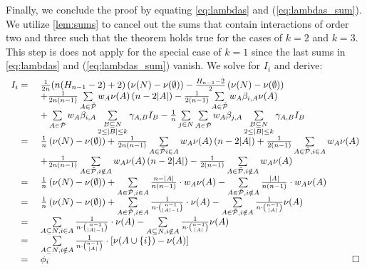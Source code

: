 Finally, we conclude the proof by equating \cref{eq:lambdas} and (\ref{eq:lambdas_sum}).
We utilize \cref{lem:sums} to cancel out the sums that contain interactions of order two and three such that the theorem holds true for the cases of $k=2$ and $k=3$.
This step is does not apply for the special case of $k=1$ since the last sums in \cref{eq:lambdas} and (\ref{eq:lambdas_sum}) vanish.
We solve for $I_i$ and derive:
\begin{equation*}
	\begin{array}{rll}
        I_i = & \ \frac{1}{2n} (n(H_{n-1} - 2) + 2) \left( \nu(N) - \nu(\emptyset) \right) - \frac{H_{n-1} - 2}{2} \left( \nu(N) - \nu(\emptyset) \right) \\
        & \ + \frac{1}{2n(n-1)} \sum\limits_{A \in \tilde{\mathcal{P}}} w_A \nu(A) \left( n-2|A| \right) - \frac{1}{2(n-1)} \sum\limits_{A \in \tilde{\mathcal{P}}} w_A \beta_{i,A} \nu(A) \\
        & \ + \sum\limits_{A \in \tilde{\mathcal{P}}} w_A \beta_{i,A} \sum\limits_{\substack{B \subseteq N \\ 2 \leq |B| \leq k}} \gamma_{A,B} I_B - \frac{1}{n} \sum\limits_{j \in N} \sum\limits_{A \in \tilde{\mathcal{P}}} w_A \beta_{j,A} \sum\limits_{\substack{B \subseteq N \\ 2 \leq |B| \leq k}} \gamma_{A,B} I_B \\
        = & \ \frac{1}{n} \left( \nu(N) - \nu(\emptyset) \right) + \frac{1}{2n(n-1)} \sum\limits_{A \in \tilde{\mathcal{P}} i \in A} w_A \nu(A) \left( n-2|A| \right) + \frac{1}{2(n-1)} \sum\limits_{A \in \tilde{\mathcal{P}}, i \in A} w_A \nu(A) \\
        & \ + \frac{1}{2n(n-1)} \sum\limits_{A \in \tilde{\mathcal{P}}, i \notin A} w_A \nu(A) \left( n-2|A| \right) - \frac{1}{2(n-1)} \sum\limits_{A \in \tilde{\mathcal{P}}, i \notin A} w_A \nu(A) \\
        = & \ \frac{1}{n} \left( \nu(N) - \nu(\emptyset) \right) + \sum\limits_{A \in \tilde{\mathcal{P}}, i \in A} \frac{n-|A|}{n(n-1)} \cdot w_A \nu(A) - \sum\limits_{A \in \tilde{\mathcal{P}}, i \notin A} \frac{|A|}{n(n-1)} \cdot w_A \nu(A) \\
        = & \ \frac{1}{n} \left( \nu(N) - \nu(\emptyset) \right) + \sum\limits_{A \in \tilde{\mathcal{P}}, i \in A} \frac{1}{n \cdot \binom{n-1}{|A|-1}} \cdot \nu(A) - \sum\limits_{A \in \tilde{\mathcal{P}}, i \notin A} \frac{1}{n \cdot \binom{n-1}{|A|}} \nu(A) \\
        = & \ \sum\limits_{A \subseteq N, i \in A} \frac{1}{n \cdot \binom{n-1}{|A|-1}} \cdot \nu(A) - \sum\limits_{A \subseteq N, i \notin A} \frac{1}{n \cdot \binom{n-1}{|A|}} \nu(A) \\
        = & \ \sum\limits_{A \subseteq N, i \notin A} \frac{1}{n \cdot \binom{n-1}{|A|}} \cdot \left[ \nu(A \cup \{i\}) - \nu(A) \right] \\
        = & \ \phi_i \hfill \qed
	\end{array}
\end{equation*}
